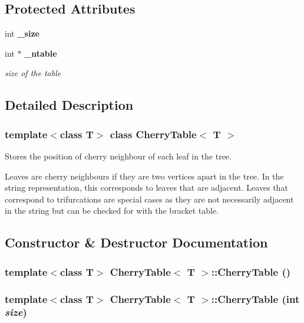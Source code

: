 \subsection*{Protected Attributes}
\begin{CompactItemize}
\item 
int {\bf \_\-size}
\item 
int $\ast$ {\bf \_\-ntable}
\begin{CompactList}\small\item\em size of the table \item\end{CompactList}\end{CompactItemize}


\subsection{Detailed Description}
\subsubsection*{template$<$class T$>$ class Cherry\-Table$<$ T $>$}

Stores the position of cherry neighbour of each leaf in the tree. 

Leaves are cherry neighbours if they are two vertices apart in the tree. In the string representation, this corresponds to leaves that are adjacent. Leaves that correspond to trifurcations are special cases as they are not necessarily adjacent in the string but can be checked for with the bracket table. 



\subsection{Constructor \& Destructor Documentation}
\subsubsection{\setlength{\rightskip}{0pt plus 5cm}template$<$class T$>$ {\bf Cherry\-Table}$<$ T $>$::{\bf Cherry\-Table} ()}\label{classCherryTable_a0}


\subsubsection{\setlength{\rightskip}{0pt plus 5cm}template$<$class T$>$ {\bf Cherry\-Table}$<$ T $>$::{\bf Cherry\-Table} (int {\em size})}\label{classCherryTable_a1}


